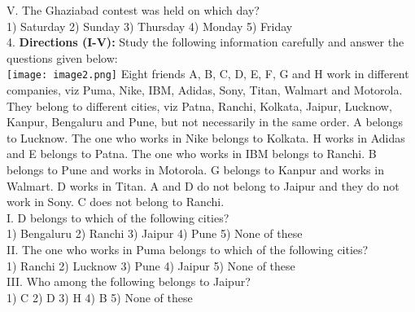 \documentclass[
]{article}
\begin{document}
V. The Ghaziabad contest was held on which day?\\
1) Saturday \hspace{2mm}2) Sunday \hspace{2mm}3) Thursday \hspace{2mm}4) Monday \hspace{2mm}5) Friday\\

4. \textbf{Directions (I-V):} Study the following information carefully and answer the questions given
below:\\\texttt{[image: image2.png]}
Eight friends A, B, C, D, E, F, G and H work in different companies, viz Puma, Nike, IBM,
Adidas, Sony, Titan, Walmart and Motorola. They belong to different cities, viz Patna,
Ranchi, Kolkata, Jaipur, Lucknow, Kanpur, Bengaluru and Pune, but not necessarily in the
same order.
A belongs to Lucknow. The one who works in Nike belongs to Kolkata. H works in Adidas
and E belongs to Patna. The one who works in IBM belongs to Ranchi. B belongs to Pune
and works in Motorola. G belongs to Kanpur and works in Walmart. D works in Titan. A
and D do not belong to Jaipur and they do not work in Sony. C does not belong to Ranchi.\\

I. D belongs to which of the following cities?\\
1) Bengaluru \hspace{2mm}2) Ranchi \hspace{2mm}3) Jaipur
\hspace{2mm}4) Pune \hspace{2mm}5) None of these\\

II. The one who works in Puma belongs to which of the following cities?\\
1) Ranchi \hspace{2mm}2) Lucknow \hspace{2mm}3) Pune \hspace{2mm}4) Jaipur \hspace{2mm}5) None of these\\

III. Who among the following belongs to Jaipur?\\
1) C \hspace{2mm}2) D \hspace{2mm}3) H \hspace{2mm}4) B \hspace{2mm}5) None of these\\
\end{document}
